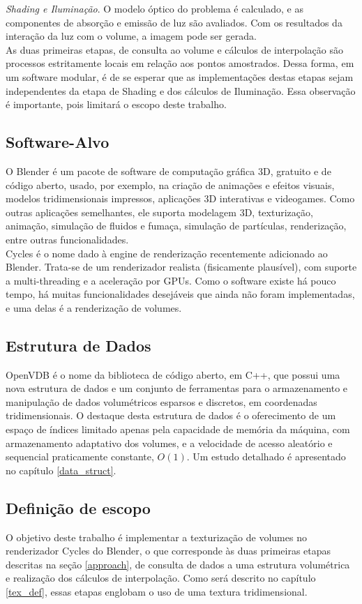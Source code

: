 \documentclass[12pt, a4paper, oneside]{book}
\begin{document}
\emph{Shading e Iluminação}. O modelo óptico do problema é calculado, e as componentes de absorção e emissão de luz são avaliados. Com os resultados da interação da luz com o volume, a imagem pode ser gerada.\\

As duas primeiras etapas, de consulta ao volume e cálculos de interpolação são processos estritamente locais em relação aos pontos amostrados. Dessa forma, em um software modular, é de se esperar que as implementações destas etapas sejam independentes da etapa de Shading e dos cálculos de Iluminação. Essa observação é importante, pois limitará o escopo deste trabalho.

\subsection{Software-Alvo}
O Blender é um pacote de software de computação gráfica 3D, gratuito e de código aberto, usado, por exemplo, na criação de animações e efeitos visuais, modelos tridimensionais impressos, aplicações 3D interativas e videogames. Como outras aplicações semelhantes, ele suporta modelagem 3D, texturização, animação, simulação de fluidos e fumaça, simulação de partículas, renderização, entre outras funcionalidades. \\

Cycles é o nome dado à engine de renderização recentemente adicionado ao Blender. Trata-se de um renderizador realista (fisicamente plausível), com suporte a multi-threading e a aceleração por GPUs. Como o software existe há pouco tempo, há muitas funcionalidades desejáveis que ainda não foram implementadas, e uma delas é a renderização de volumes.

\subsection{Estrutura de Dados}
OpenVDB é o nome da biblioteca de código aberto, em C++, que possui uma nova estrutura de dados e um conjunto de ferramentas para o armazenamento e manipulação de dados volumétricos esparsos e discretos, em coordenadas tridimensionais. O destaque desta estrutura de dados é o oferecimento de um espaço de índices limitado apenas pela capacidade de memória da máquina, com armazenamento adaptativo dos volumes, e a velocidade de acesso aleatório e sequencial praticamente constante, $O(1)$. Um estudo detalhado é apresentado no capítulo \ref{data_struct}.

\subsection{Definição de escopo}
O objetivo deste trabalho é implementar a texturização de volumes no renderizador Cycles do Blender, o que corresponde às duas primeiras etapas descritas na seção \ref{approach}, de consulta de dados a uma estrutura volumétrica e realização dos cálculos de interpolação. Como será descrito no capítulo \ref{tex_def}, essas etapas englobam o uso de uma textura tridimensional.\\
\end{document}
